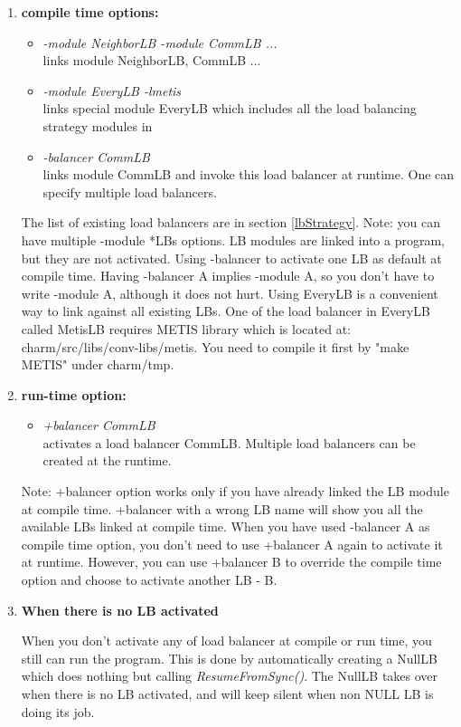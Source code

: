 \begin{enumerate}
\item {\bf compile time options:}

\begin{itemize}
\item {\em -module NeighborLB -module CommLB ...}  \\
  links module NeighborLB, CommLB ...
\item {\em -module EveryLB -lmetis} \\
  links special module EveryLB which includes all the load balancing strategy modules in \charmpp{}
\item {\em -balancer CommLB} \\
  links module CommLB and invoke this load balancer at runtime. One can specify multiple load balancers.
\end{itemize}

The list of existing load balancers are in section \ref{lbStrategy}.
Note: you can have multiple -module *LBs options. LB modules are
linked into a program, but they are not activated.
Using -balancer to activate one LB as default at compile time. Having -balancer A implies -module A, so you don't have to write -module A, although it does
not hurt.
Using EveryLB is a convenient way to link against all existing LBs. 
One of the load balancer in EveryLB called MetisLB requires METIS library 
which is located at: charm/src/libs/conv-libs/metis. 
You need to compile it first by "make METIS" under charm/tmp.

\item {\bf run-time option:}

\begin{itemize}
\item {\em +balancer CommLB} \\
  activates a load balancer CommLB. Multiple load balancers can be created at the runtime.
\end{itemize}

Note: +balancer option works only if you have already linked the LB module 
at compile time. +balancer with a 
wrong LB name will show you all the available LBs linked at compile time.
When you have used -balancer A as compile time option, you don't need to use 
+balancer A again to activate it at runtime. However, you can 
use +balancer B to override the compile time option and choose to
activate another LB - B.

\item {\bf When there is no LB activated}

When you don't activate any of load balancer at compile or run time, you still 
can run the program. This is done by automatically creating a NullLB which 
does nothing but calling {\em ResumeFromSync()}. 
The NullLB takes over when there is no LB activated, and will keep silent 
when non NULL LB is doing its job. 

\end{enumerate}

